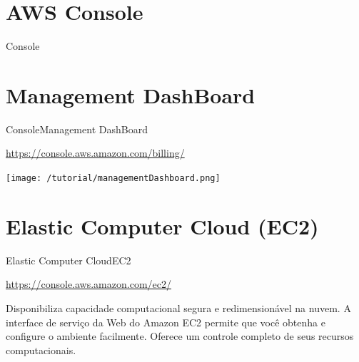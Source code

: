 \documentclass[xcolor=table]{beamer}
\begin{document}
\section{AWS Console}
\begin{frame}[c]{Console}

    
    
\end{frame}


\section{Management DashBoard}
\begin{frame}[c]{Console}{Management DashBoard}

        \begin{outline}
            \1[]\url{https://console.aws.amazon.com/billing/}
        \end{outline}
        
        \begin{center}
            \texttt{[image: /tutorial/managementDashboard.png]} 
        \end{center}

\end{frame}


\section{Elastic Computer Cloud (EC2)}
\begin{frame}[c]{Elastic Computer Cloud}{EC2}

        \begin{outline}
            \1[]\url{https://console.aws.amazon.com/ec2/}
        \end{outline}
        
        \begin{center}
            \begin{outline}                
                \1 Disponibiliza capacidade computacional segura e redimensionável na nuvem.
                \1 A interface de serviço da Web do Amazon EC2 permite que você obtenha e configure o ambiente facilmente. 
                \1 Oferece um controle completo de seus recursos computacionais.
            \end{outline}
        \end{center}

\end{frame}
\end{document}
